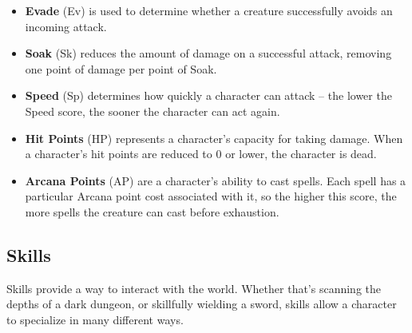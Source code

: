 \begin{itemize}
\item {\bf Evade} (Ev) is used to determine whether a creature successfully
avoids an incoming attack.

\item {\bf Soak} (Sk) reduces the amount of damage on a successful attack,
removing one point of damage per point of Soak.

\item {\bf Speed} (Sp) determines how quickly a character can attack -- the
lower the Speed score, the sooner the character can act again.

\item {\bf Hit Points} (HP) represents a character's capacity for taking 
damage.  When a character's hit points are reduced to 0 or lower, the 
character is dead.

\item {\bf Arcana Points} (AP) are a character's ability to cast spells.  
Each spell has a particular Arcana point cost associated with it, so the 
higher this score, the more spells the creature can cast before exhaustion.
\end{itemize}

\subsection{Skills}

Skills provide a way to interact with the world.  Whether that's scanning
the depths of a dark dungeon, or skillfully wielding a sword, skills allow
a character to specialize in many different ways.


